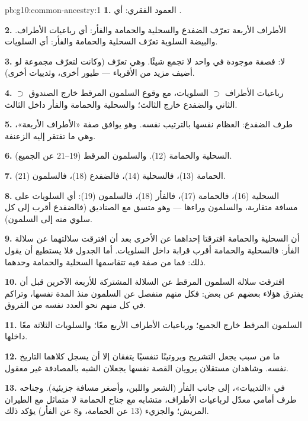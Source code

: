 \begin{solution}{pb:g10:common-ancestry:1}
\textbf{1.} العمود الفقري: أي .

\textbf{2.} الأطراف الأربعة تعرّف الضفدع والسحلية والحمامة والفأر: أي
رباعيات الأطراف. والبيضة السلوية تعرّف السحلية والحمامة والفأر: أي
السلويات.

\textbf{3.} لا: فصفة موجودة في  واحد لا تجمع شيئًا. وهي تعرّف 
(وكانت لتعرّف مجموعة لو أضيف مزيد من الأقرباء --- طيور أخرى، وثدييات
أخرى).

\textbf{4.}  $\supset$ رباعيات الأطراف $\supset$ السلويات، مع
وقوع السلمون المرقط خارج الصندوق الثاني والضفدع خارج الثالث؛ والسحلية
والحمامة والفأر داخل الثالث.

\textbf{5.} طرف الضفدع: العظام نفسها بالترتيب نفسه. وهو يوافق صفة
«الأطراف الأربعة»، وهي ما تفتقر إليه الزعنفة.

\textbf{6.} السحلية والحمامة (12). والسلمون المرقط (19--21 عن الجميع).

\textbf{7.} الحمامة (13)، فالسحلية (14)، فالضفدع (18)، فالسلمون (21).

\textbf{8.} السحلية (16)، فالحمامة (17)، فالفأر (18)، فالسلمون (19):
أي السلويات على مسافة متقاربة، والسلمون وراءها --- وهو متسق مع
الصناديق (فالضفدع أقرب إلى كل سلوي منه إلى السلمون).

\textbf{9.} أن السحلية والحمامة افترقتا إحداهما عن الأخرى بعد أن
افترقت سلالتهما عن سلالة الفأر: فالسحلية والحمامة أقرب قرابة داخل
السلويات. أما الجدول فلا يستطيع أن يقول ذلك: فما من صفة فيه تتقاسمها
السحلية والحمامة وحدهما.

\textbf{10.} افترقت سلالة السلمون المرقط عن السلالة المشتركة للأربعة
الآخرين قبل أن يفترق هؤلاء بعضهم عن بعض: فكل منهم منفصل عن السلمون
منذ المدة نفسها، وتراكم في كل منهم نحو العدد نفسه من الفروق.

\textbf{11.} السلمون المرقط خارج الجميع؛ ورباعيات الأطراف الأربع معًا؛
والسلويات الثلاثة معًا داخلها.

\textbf{12.} ما من سبب يجعل التشريح وبروتينًا تنفسيًا يتفقان إلا أن
يسجل كلاهما التاريخ نفسه. وشاهدان مستقلان يرويان القصة نفسها يجعلان
الشبه بالمصادفة غير معقول.

\textbf{13.} في «الثدييات»، إلى جانب الفأر (الشعر واللبن، وأصغر مسافة
جزيئية). وجناحه طرف أمامي معدّل لرباعيات الأطراف، متشابه مع جناح
الحمامة لا متماثل مع الطيران المريش؛ والجزيء (13 عن الحمامة، و8 عن
الفأر) يؤكد ذلك.


\end{solution}

